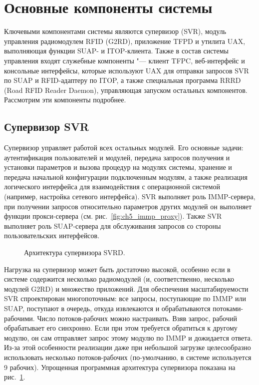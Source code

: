 \section{Основные компоненты системы}\label{sec:ch5_components}

Ключевыми компонентами системы являются супервизор (SVR), модуль управления радиомодулем RFID (G2RD), приложение TFPD и утилита UAX, выполняющая функции SUAP- и ITOP-клиента. Также в состав системы управления входят служебные компоненты "--- клиент TFPC, веб-интерфейс и консольные интерфейсы, которые используют UAX для отправки запросов SVR по SUAP и RFID-адаптеру по ITOP, а также специальная программа RRRD (Road RFID Reader Daemon), управляющая запуском остальных компонентов. Рассмотрим эти компоненты подробнее.


\subsection{Супервизор SVR}\label{sec:ch5_components_svr}

Супервизор управляет работой всех остальных модулей. Его основные задачи: аутентификация пользователей и модулей, передача запросов получения и установки параметров и вызова процедур на модулях системы, хранение и передача начальной конфигурации подключенным модулям, а также реализация логического интерфейса для взаимодействия с операционной системой (например, настройка сетевого интерфейса). SVR выполняет роль IMMP-сервера, при получении запросов относительно параметров других модулей он выполняет функции прокси-сервера (см. рис.~\ref{fig:ch5_immp_proxy}). Также SVR выполняет роль SUAP-сервера для обслуживания запросов со стороны пользовательских интерфейсов.

\begin{figure}[ht]
  \caption{Архитектура супервизора SVRD.}
  \label{fig:ch5_svrd_threads}
\end{figure}

Нагрузка на супервизор может быть достаточно высокой, особенно если в системе содержится несколько радиомодулей (и, соответственно, несколько модулей G2RD) и множество приложений. Для обеспечения масштабируемости SVR спроектирован многопоточным: все запросы, поступающие по IMMP или SUAP, поступают в очередь, откуда извлекаются и обрабатываются потоками-рабочими. Число потоков-рабочих можно настраивать. Взяв запрос, рабочий обрабатывает его синхронно. Если при этом требуется обратиться к другому модулю, он сам отправляет запрос этому модулю по IMMP и дожидается ответа. Из-за этой особенности реализации даже при небольшой загрузке целесообразно использовать несколько потоков-рабочих (по-умолчанию, в системе используется 9 рабочих). Упрощенная программная архитектура супервизора показана на рис.~\ref{fig:ch5_svrd_threads}.

